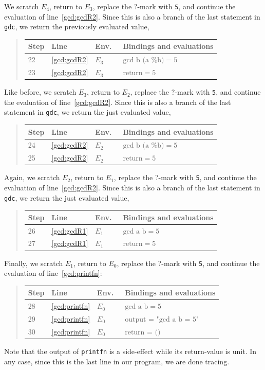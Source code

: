 \documentclass[fsharpNotes.tex]{subfiles}
\begin{document}
We scratch $E_4$, return to $E_3$, replace the ?-mark with \lstinline!5!, and continue the evaluation of line~\ref{gcd:gcdR2}. Since this is also a branch of the last statement in \lstinline{gdc}, we return the previously evaluated value,
\begin{quote}
  \begin{tabular*}{0.6\linewidth}{l|lll}
    Step & Line & Env.\ & Bindings and evaluations\\
    \hline
    22&\ref{gcd:gcdR2} & $E_3$ & $\text{gcd b (a \% b)} = 5$\\
    23&\ref{gcd:gcdR2} & $E_3$ & $\text{return} = 5$\\
  \end{tabular*}
\end{quote}
Like before, we scratch $E_3$, return to $E_2$, replace the ?-mark with \lstinline!5!, and continue the evaluation of line~\ref{gcd:gcdR2}. Since this is also a branch of the last statement in \lstinline{gdc}, we return the just evaluated value,
\begin{quote}
  \begin{tabular*}{0.6\linewidth}{l|lll}
    Step & Line & Env.\ & Bindings and evaluations\\
    \hline
    24&\ref{gcd:gcdR2} & $E_2$ & $\text{gcd b (a \% b)} = 5$\\
    25&\ref{gcd:gcdR2} & $E_2$ & $\text{return} = 5$\\
  \end{tabular*}
\end{quote}
Again, we scratch $E_2$, return to $E_1$, replace the ?-mark with \lstinline!5!, and continue the evaluation of line~\ref{gcd:gcdR2}. Since this is also a branch of the last statement in \lstinline{gdc}, we return the just evaluated value,
\begin{quote}
  \begin{tabular*}{0.6\linewidth}{l|lll}
    Step & Line & Env.\ & Bindings and evaluations\\
    \hline
    26&\ref{gcd:gcdR1} & $E_1$ & $\text{gcd a b} = 5$\\
    27&\ref{gcd:gcdR1} & $E_1$ & $\text{return} = 5$\\
  \end{tabular*}
\end{quote}
Finally, we scratch $E_1$, return to $E_0$, replace the ?-mark with \lstinline!5!, and continue the evaluation of line~\ref{gcd:printfn}:
\begin{quote}
  \begin{tabular*}{0.6\linewidth}{l|lll}
    Step & Line & Env.\ & Bindings and evaluations\\
    \hline
    28&\ref{gcd:printfn} & $E_0$ & $\text{gcd a b} = 5$\\
    29& \ref{gcd:printfn} & $E_0$ & $\text{output = "gcd a b = 5"}$\\
    30& \ref{gcd:printfn} & $E_0$ & $\text{return = ()}$\\
  \end{tabular*}
\end{quote}
Note that the output of \lstinline{printfn} is a side-effect while its return-value is unit. In any case, since this is the last line in our program, we are done tracing.
\end{document}
